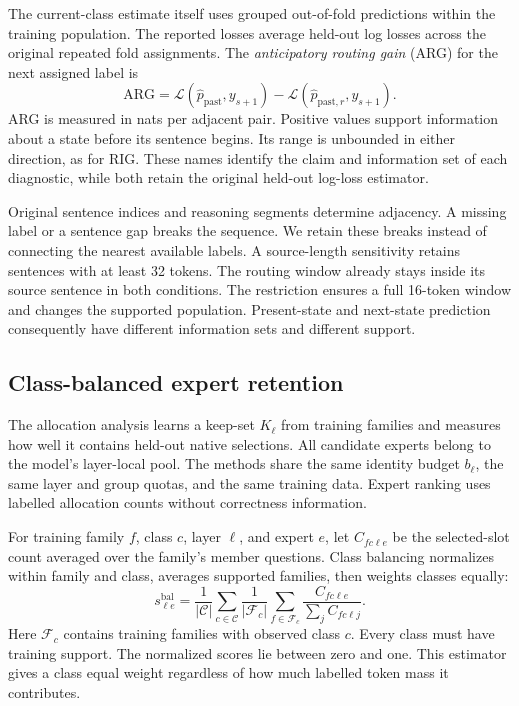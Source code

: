 The current-class estimate itself uses grouped out-of-fold predictions within the training population.
%
The reported losses average held-out log losses across the original repeated fold assignments.
%
The \emph{anticipatory routing gain} (ARG) for the next assigned label is
\begin{equation}
 \mathrm{ARG}=\mathcal L(\widehat p_{\mathrm{past}},y_{s+1})
 -\mathcal L(\widehat p_{\mathrm{past},r},y_{s+1}).
 \label{eq:anticipation}
\end{equation}
ARG is measured in nats per adjacent pair.
%
Positive values support information about a state before its sentence begins.
%
Its range is unbounded in either direction, as for RIG.
%
These names identify the claim and information set of each diagnostic, while both retain the original held-out log-loss estimator.
%

Original sentence indices and reasoning segments determine adjacency.
%
A missing label or a sentence gap breaks the sequence.
%
We retain these breaks instead of connecting the nearest available labels.
%
A source-length sensitivity retains sentences with at least 32 tokens.
%
The routing window already stays inside its source sentence in both conditions.
%
The restriction ensures a full 16-token window and changes the supported population.
%
Present-state and next-state prediction consequently have different information sets and different support.
%

\subsection{Class-balanced expert retention}
\label{sec:selection-method}

The allocation analysis learns a keep-set $K_\ell$ from training families and measures how well it contains held-out native selections.
%
All candidate experts belong to the model's layer-local pool.
%
The methods share the same identity budget $b_\ell$, the same layer and group quotas, and the same training data.
%
Expert ranking uses labelled allocation counts without correctness information.
%

For training family $f$, class $c$, layer $\ell$, and expert $e$, let $C_{fc\ell e}$ be the selected-slot count averaged over the family's member questions.
%
Class balancing normalizes within family and class, averages supported families, then weights classes equally:
\begin{equation}
 s^{\mathrm{bal}}_{\ell e}
 =\frac{1}{|\mathcal C|}\sum_{c\in\mathcal C}
 \frac{1}{|\mathcal F_c|}\sum_{f\in\mathcal F_c}
 \frac{C_{fc\ell e}}{\sum_jC_{fc\ell j}}.
 \label{eq:balanced-selection}
\end{equation}
Here $\mathcal F_c$ contains training families with observed class $c$.
%
Every class must have training support.
%
The normalized scores lie between zero and one.
%
This estimator gives a class equal weight regardless of how much labelled token mass it contributes.
%

